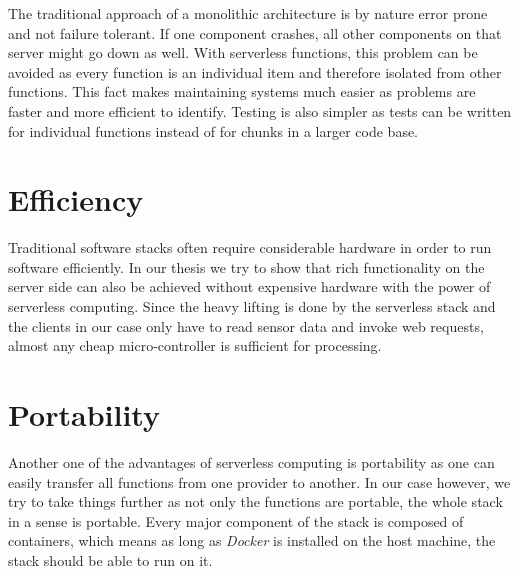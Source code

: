 The traditional approach of a monolithic architecture is by nature error prone and not failure
tolerant. If one component crashes, all other components on that server might go down as well. With
serverless functions, this problem can be avoided as every function is an individual item and
therefore isolated from other functions. This fact makes maintaining systems much easier as problems
are faster and more efficient to identify. Testing is also simpler as tests can be written for
individual functions instead of for chunks in a larger code base.

\section{Efficiency}

Traditional software stacks often require considerable hardware in order to run software
efficiently. In our thesis we try to show that rich functionality on the server side can also be
achieved without expensive hardware with the power of serverless computing. Since the heavy lifting
is done by the serverless stack and the clients in our case only have to read sensor data and invoke
web requests, almost any cheap micro-controller is sufficient for processing.

\section{Portability}

Another one of the advantages of serverless computing is portability as one can easily transfer all
functions from one provider to another. In our case however, we try to take things further as not
only the functions are portable, the whole stack in a sense is portable. Every major component of
the stack is composed of containers, which means as long as \textit{Docker} is installed on the host
machine, the stack should be able to run on it.
